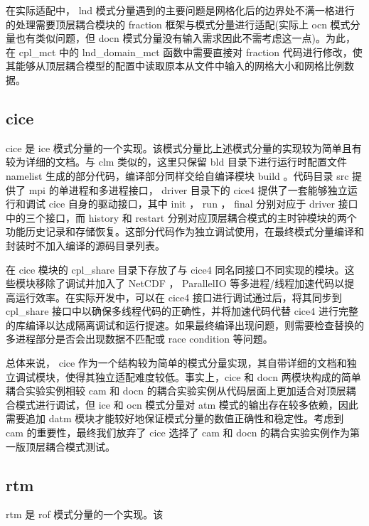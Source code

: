 在实际适配中， lnd 模式分量遇到的主要问题是网格化后的边界处不满一格进行的处理需要顶层耦合模块的 fraction 框架与模式分量进行适配(实际上 ocn 模式分量也有类似问题，但 docn 模式分量没有输入需求因此不需考虑这一点)。为此，在 cpl\_mct 中的 lnd\_domain\_mct 函数中需要直接对 fraction 代码进行修改，使其能够从顶层耦合模型的配置中读取原本从文件中输入的网格大小和网格比例数据。

\subsection{cice}

cice 是 ice 模式分量的一个实现。该模式分量比上述模式分量的实现较为简单且有较为详细的文档。与 clm 类似的，这里只保留 bld 目录下进行运行时配置文件 namelist 生成的部分代码，编译部分同样交给自编译模块 build 。代码目录 src 提供了 mpi 的单进程和多进程接口， driver 目录下的 cice4 提供了一套能够独立运行和调试 cice 自身的驱动接口，其中 init ， run ， final 分别对应于 driver 接口中的三个接口，而 history 和 restart 分别对应顶层耦合模式的主时钟模块的两个功能历史记录和存储恢复。这部分代码作为独立调试使用，在最终模式分量编译和封装时不加入编译的源码目录列表。

在 cice 模块的 cpl\_share 目录下存放了与 cice4 同名同接口不同实现的模块。这些模块移除了调试并加入了 NetCDF ， ParallelIO 等多进程/线程加速代码以提高运行效率。在实际开发中，可以在 cice4 接口进行调试通过后，将其同步到 cpl\_share 接口中以确保多线程代码的正确性，并将加速代码代替 cice4 进行完整的库编译以达成隔离调试和运行提速。如果最终编译出现问题，则需要检查替换的多进程部分是否会出现数据不匹配或 race condition 等问题。

总体来说， cice 作为一个结构较为简单的模式分量实现，其自带详细的文档和独立调试模块，使得其独立适配难度较低。事实上，cice 和 docn 两模块构成的简单耦合实验实例相较 cam 和 docn 的耦合实验实例从代码层面上更加适合对顶层耦合模式进行调试，但 ice 和 ocn 模式分量对 atm 模式的输出存在较多依赖，因此需要追加 datm 模块才能较好地保证模式分量的数值正确性和稳定性。考虑到 cam 的重要性，最终我们放弃了 cice 选择了 cam 和 docn 的耦合实验实例作为第一版顶层耦合模式测试。

\subsection{rtm}

rtm 是 rof 模式分量的一个实现。该